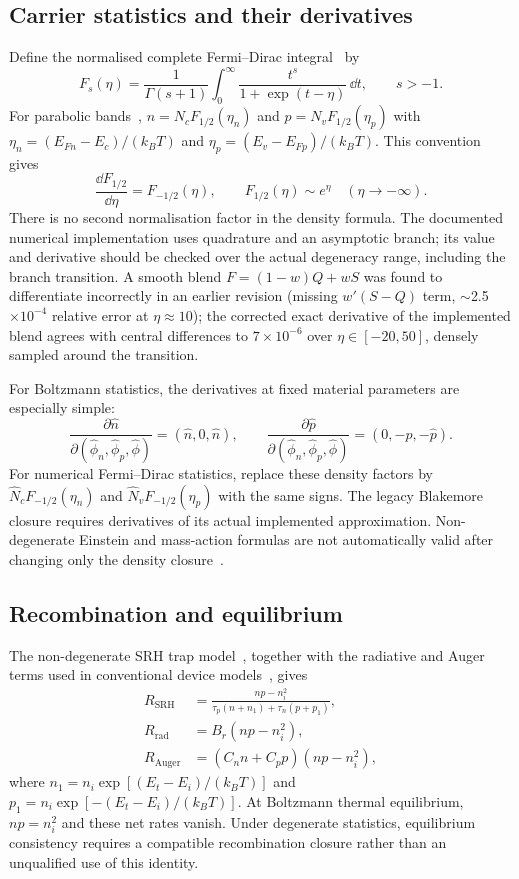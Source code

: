 \documentclass[11pt,a4paper]{article}
\numberwithin{equation}{section}
\begin{document}
\subsection{Carrier statistics and their derivatives}
Define the normalised complete Fermi--Dirac integral~\cite{dlmf} by
\begin{equation}
F_s(\eta)=\frac{1}{\Gamma(s+1)}\int_0^\infty
\frac{t^s}{1+\exp(t-\eta)}\,\dd t,\qquad s>-1.
\end{equation}
For parabolic bands~\cite{blakemore1982}, $n=N_cF_{1/2}(\eta_n)$ and
$p=N_vF_{1/2}(\eta_p)$ with
$\eta_n=(E_{Fn}-E_c)/(k_BT)$ and
$\eta_p=(E_v-E_{Fp})/(k_BT)$. This convention gives
\begin{equation}
\frac{\dd F_{1/2}}{\dd\eta}=F_{-1/2}(\eta),\qquad
F_{1/2}(\eta)\sim e^\eta\quad(\eta\to-\infty).
\end{equation}
There is no second normalisation factor in the density formula.
The documented numerical implementation uses quadrature and an
asymptotic branch; its value and derivative should be checked over the
actual degeneracy range, including the branch transition. A smooth blend
$F=(1-w)Q+wS$ was found to differentiate incorrectly in an earlier
revision (missing $w'(S-Q)$ term, $\sim$2.5$\times10^{-4}$ relative error
at $\eta\approx10$); the corrected exact derivative of the implemented
blend agrees with central differences to $7\times10^{-6}$ over
$\eta\in[-20,50]$, densely sampled around the transition.

For Boltzmann statistics, the derivatives at fixed material parameters
are especially simple:
\begin{equation}
\frac{\partial\hat n}{\partial(\hat\phi_n,\hat\phi_p,\hat\phi)}
=(\hat n,0,\hat n),\qquad
\frac{\partial\hat p}{\partial(\hat\phi_n,\hat\phi_p,\hat\phi)}
=(0,-\hat p,-\hat p).
\label{supp:densityderivatives}
\end{equation}
For numerical Fermi--Dirac statistics, replace these density factors by
$\hat N_cF_{-1/2}(\eta_n)$ and $\hat N_vF_{-1/2}(\eta_p)$ with the
same signs. The legacy Blakemore closure requires derivatives of its
actual implemented approximation. Non-degenerate Einstein and
mass-action formulas are not automatically valid after changing only the
density closure~\cite{blakemore1982}.

\subsection{Recombination and equilibrium}
The non-degenerate SRH trap model~\cite{shockleyread1952,hall1952},
together with the radiative and Auger terms used in conventional
device models~\cite{gaury2019}, gives
\begin{align}
R_{\mathrm{SRH}}&=\frac{np-n_i^2}{\tau_p(n+n_1)+\tau_n(p+p_1)},\\
R_{\mathrm{rad}}&=B_r(np-n_i^2),\\
R_{\mathrm{Auger}}&=(C_n n+C_p p)(np-n_i^2),
\end{align}
where $n_1=n_i\exp[(E_t-E_i)/(k_BT)]$ and
$p_1=n_i\exp[-(E_t-E_i)/(k_BT)]$.
At Boltzmann thermal equilibrium, $np=n_i^2$ and these net rates vanish.
Under degenerate statistics, equilibrium consistency requires a compatible
recombination closure rather than an unqualified use of this identity.
\end{document}
